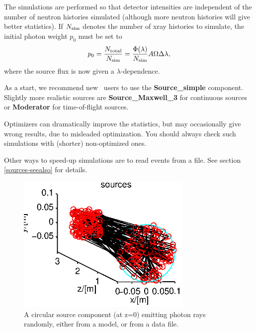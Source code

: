 The simulations are performed so that detector intensities
are independent of the number of neutron histories simulated
(although more neutron histories will give better statistics).
If $N_{\rm sim}$ denotes the number of
xray histories to simulate, the initial photon weight $p_0$ must be set to
\begin{equation}
\label{proprule}
p_0 = \frac{N_{\rm total}}{N_{\rm sim}} =
    \frac{\Phi(\lambda)}{N_{\rm sim}} A \Omega \Delta\lambda ,
\end{equation}
where the source flux is now given a $\lambda$-dependence.

As a start, we recommend new \MCS\ users to use the
{\bf Source\_simple} component.
Slightly more realistic sources are {\bf Source\_Maxwell\_3} for
continuous sources or {\bf Moderator} for time-of-flight sources.

Optimizers can dramatically improve the statistics, but may occasionally
give wrong results, due to misleaded optimization.
You should always check such simulations with (shorter) non-optimized ones.

Other ways to speed-up simulations are to read events from a file.
See section \ref{sources-seealso} for details.

\begin{figure}
  \begin{center}
    \includegraphics[width=0.75\textwidth]{figures/sources.eps}
  \end{center}
\caption{A circular source component (at z=0) emitting photon rays randomly, either from a model, or from a data file.}
\label{f:source}
\end{figure}

\newpage




